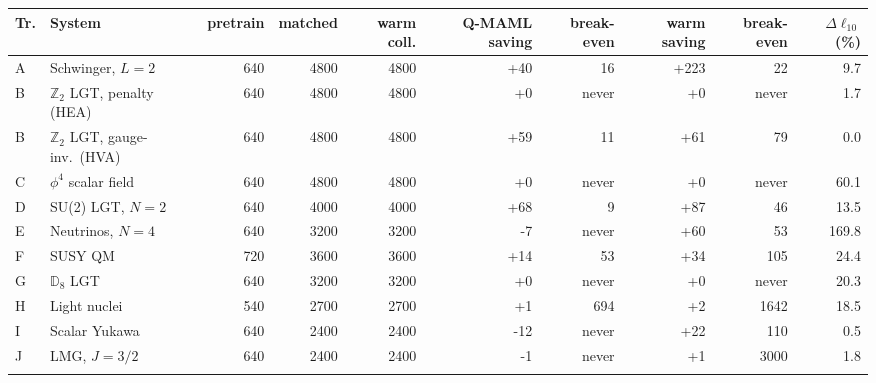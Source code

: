 \begin{tabular}{@{}llrrrrrrrr@{}}
\toprule
Tr. & System & pretrain & matched & warm coll. & Q-MAML saving & break-even & warm saving & break-even & $\Delta\ell_{10}$ (\%) \\
\midrule
A & Schwinger, $L{=}2$ & 640 & 4800 & 4800 & +40 & 16 & +223 & 22 & 9.7 \\
B & $\mathbb{Z}_2$ LGT, penalty (HEA) & 640 & 4800 & 4800 & +0 & never & +0 & never & 1.7 \\
B & $\mathbb{Z}_2$ LGT, gauge-inv.\ (HVA) & 640 & 4800 & 4800 & +59 & 11 & +61 & 79 & 0.0 \\
C & $\phi^4$ scalar field & 640 & 4800 & 4800 & +0 & never & +0 & never & 60.1 \\
D & SU(2) LGT, $N{=}2$ & 640 & 4000 & 4000 & +68 & 9 & +87 & 46 & 13.5 \\
E & Neutrinos, $N{=}4$ & 640 & 3200 & 3200 & -7 & never & +60 & 53 & 169.8 \\
F & SUSY QM & 720 & 3600 & 3600 & +14 & 53 & +34 & 105 & 24.4 \\
G & $\mathbb{D}_8$ LGT & 640 & 3200 & 3200 & +0 & never & +0 & never & 20.3 \\
H & Light nuclei & 540 & 2700 & 2700 & +1 & 694 & +2 & 1642 & 18.5 \\
I & Scalar Yukawa & 640 & 2400 & 2400 & -12 & never & +22 & 110 & 0.5 \\
J & LMG, $J{=}3/2$ & 640 & 2400 & 2400 & -1 & never & +1 & 3000 & 1.8 \\
\botrule
\end{tabular}
